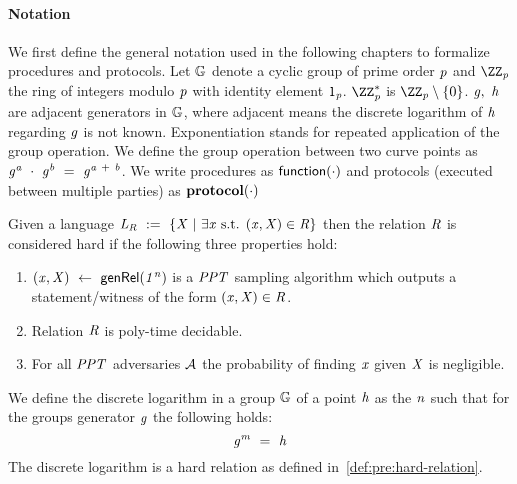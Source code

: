 \paragraph{Notation}
We first define the general notation used in the following chapters to formalize procedures and protocols.
Let $\mathbb{G}$ denote a cyclic group of prime order $\mathit{p}$ and $\cnstIntegersPrime{\varPrime}$ the ring of integers modulo $\mathit{p}$ with identity element $1_{\mathit{p}}$.
$\cnstIntegersPrimeWithoutZero{\varPrime}$ is $\cnstIntegersPrime{\varPrime} \opExcluding \funList{0}$.
$\mathit{g} ,~ \mathit{h}$ are adjacent generators in $\mathbb{G}$, where adjacent means the discrete logarithm of $\mathit{h}$ regarding $\mathit{g}$ is not known.
Exponentiation stands for repeated application of the group operation.
We define the group operation between two curve points as $\mathit{g}^{\mathit{a}} ~\cdot~ \mathit{g}^{\mathit{b}} ~=~ \mathit{g}^{\mathit{a} ~+~ \mathit{b}}$.
We write procedures as $\mathsf{function(\cdot)}$ and protocols (executed between multiple parties) as $\mathbf{protocol(\cdot)}$ 

\begin{definition}\label{def:pre:hard-relation}
    Given a language $\mathit{L}_{\mathit{R}} ~:=~ \{\mathit{X} ~|~ \exists \mathit{x} \text{ s.t. } (\mathit{x},\mathit{X}) \in \mathit{R}\}$ then the relation $\mathit{R}$ is
    considered hard if the following three properties hold:
    \begin{enumerate}
        \item $(\mathit{x}, \mathit{X}) ~\leftarrow~ \mathsf{genRel}(\mathit{1^n})$ is a $\mathit{PPT}$ sampling algorithm which outputs a statement/witness of the form $(\mathit{x}, \mathit{X}) \in \mathit{R}$.
        \item Relation $\mathit{R}$ is poly-time decidable.
        \item For all $\mathit{PPT}$ adversaries $\mathcal{A}$ the probability of finding $\mathit{x}$ given $\mathit{X}$ is negligible.
    \end{enumerate}
\end{definition}

\begin{definition}\label{def:pre:discretelog}
    We define the discrete logarithm in a group $\mathbb{G}$ of a point $\mathit{h}$ as the  $\mathit{n}$ such that for the groups generator $\mathit{g}$ the following holds:
    \[ \mathit{g}^{\mathit{m}} ~=~ \mathit{h} \] 
    The discrete logarithm is a hard relation as defined in~\cref{def:pre:hard-relation}.
\end{definition}

